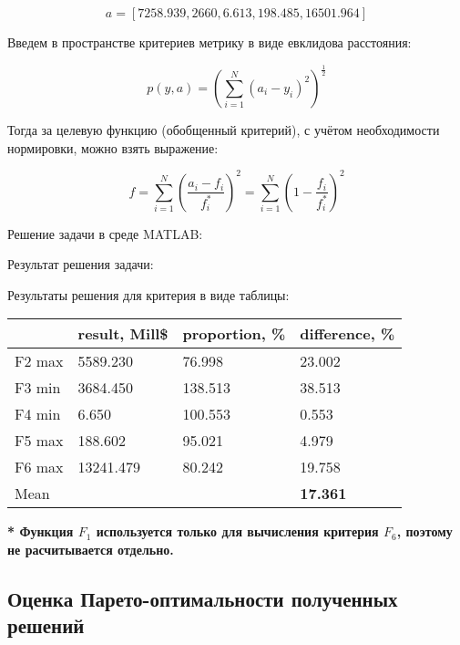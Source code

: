 \documentclass[14pt,a4paper,report]{report}
\begin{document}
\begin{equation*}
\text{$a=[7258.939, 2660, 6.613, 198.485, 16501.964]$}
\end{equation*}

Введем в пространстве критериев метрику в виде евклидова расстояния:

\begin{equation*}
\text{$p(y,a)=(\sum_{i=1}^{N}(a_i-y_i)^2)^{\frac{1}{2}}$}
\end{equation*}

Тогда за целевую функцию (обобщенный критерий), с учётом необходимости нормировки, можно взять выражение:

\begin{equation*}
\text{$f=\sum_{i=1}^{N}(\frac{a_i-f_i}{f_i^*})^2=\sum_{i=1}^{N}(1-\frac{f_i}{f_i^*})^2$}
\end{equation*}

Решение задачи в среде MATLAB:



Результат решения задачи:



Результаты решения для критерия в виде таблицы:

\begin{table}[h!]
	\centering
	\bgroup
	\def\arraystretch{1}
	\begin{tabular}{ | m{1.2cm} | m{1.9cm} | m{2.2cm} | m{2.2cm} | }
		\hline
		& result, Mill\$ & proportion, \% & difference, \% \\ \hline
		F2 max & 5589.230 & 76.998 & 23.002 \\ \hline
		F3 min & 3684.450 & 138.513 & 38.513 \\ \hline
		F4 min & 6.650 & 100.553 & 0.553 \\ \hline
		F5 max & 188.602 & 95.021 & 4.979 \\ \hline
		F6 max & 13241.479 & 80.242 & 19.758 \\ \hline
		Mean & & & \textbf{17.361} \\
		\hline
	\end{tabular}
	\egroup
\end{table}

\textbf{* Функция $F_1$ используется только для вычисления критерия $F_6$, поэтому не расчитывается отдельно.}

\subsection{Оценка Парето-оптимальности полученных решений}
\end{document}
